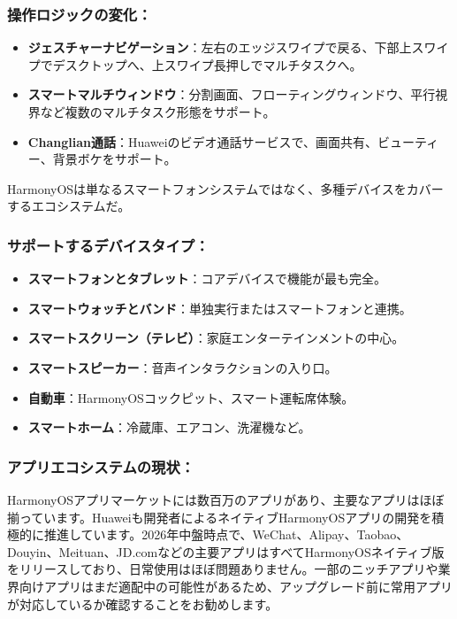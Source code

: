 \subsubsection*{操作ロジックの変化：}

\begin{itemize}
  \item \textbf{ジェスチャーナビゲーション}：左右のエッジスワイプで戻る、下部上スワイプでデスクトップへ、上スワイプ長押しでマルチタスクへ。
  \item \textbf{スマートマルチウィンドウ}：分割画面、フローティングウィンドウ、平行視界など複数のマルチタスク形態をサポート。
  \item \textbf{Changlian通話}：Huaweiのビデオ通話サービスで、画面共有、ビューティー、背景ボケをサポート。
\end{itemize}


HarmonyOSは単なるスマートフォンシステムではなく、多種デバイスをカバーするエコシステムだ。

\subsubsection*{サポートするデバイスタイプ：}

\begin{itemize}
  \item \textbf{スマートフォンとタブレット}：コアデバイスで機能が最も完全。
  \item \textbf{スマートウォッチとバンド}：単独実行またはスマートフォンと連携。
  \item \textbf{スマートスクリーン（テレビ）}：家庭エンターテインメントの中心。
  \item \textbf{スマートスピーカー}：音声インタラクションの入り口。
  \item \textbf{自動車}：HarmonyOSコックピット、スマート運転席体験。
  \item \textbf{スマートホーム}：冷蔵庫、エアコン、洗濯機など。
\end{itemize}

\subsubsection*{アプリエコシステムの現状：}

HarmonyOSアプリマーケットには数百万のアプリがあり、主要なアプリはほぼ揃っています。Huaweiも開発者によるネイティブHarmonyOSアプリの開発を積極的に推進しています。2026年中盤時点で、WeChat、Alipay、Taobao、Douyin、Meituan、JD.comなどの主要アプリはすべてHarmonyOSネイティブ版をリリースしており、日常使用はほぼ問題ありません。一部のニッチアプリや業界向けアプリはまだ適配中の可能性があるため、アップグレード前に常用アプリが対応しているか確認することをお勧めします。

